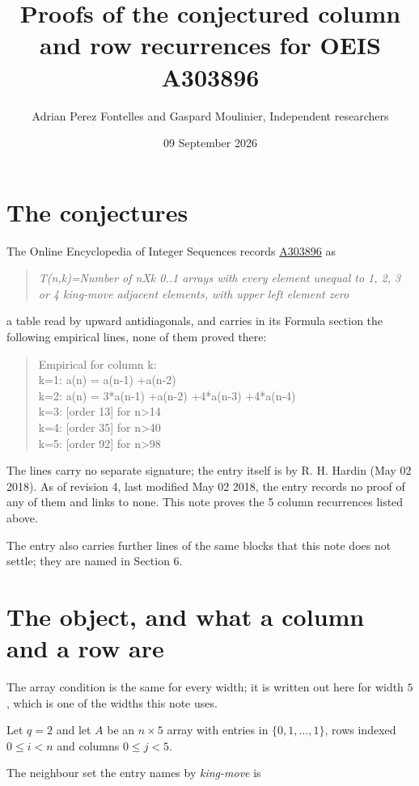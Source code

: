 \documentclass[11pt]{article}
\title{Proofs of the conjectured column and row recurrences for OEIS A303896}
\author{Adrian Perez Fontelles and Gaspard Moulinier, Independent researchers}
\date{09 September 2026}
\theoremstyle{definition}
\begin{document}
\maketitle
\section{The conjectures}

The Online Encyclopedia of Integer Sequences records \href{https://oeis.org/A303896}{A303896} as

\begin{quote}\itshape T(n,k)=Number of nXk 0..1 arrays with every element unequal to 1, 2, 3 or 4 king-move adjacent elements, with upper left element zero\end{quote}

a table read by upward antidiagonals, and carries in its Formula section the following empirical lines, none of them proved there:

\begin{quote}\ttfamily Empirical for column k:\\
k=1: a(n) = a(n-1) +a(n-2)\\k=2: a(n) = 3*a(n-1) +a(n-2) +4*a(n-3) +4*a(n-4)\\k=3: [order 13] for n>14\\k=4: [order 35] for n>40\\k=5: [order 92] for n>98\end{quote}

The lines carry no separate signature; the entry itself is by R. H. Hardin (May 02 2018). As of revision 4, last modified May 02 2018, the entry records no proof of any of them and links to none. This note proves the 5 column recurrences listed above.

The entry also carries further lines of the same blocks that this note does not settle; they are named in Section 6.

\section{The object, and what a column and a row are}

The array condition is the same for every width; it is written out here for width $5$, which is one of the widths this note uses.

Let $q = 2$ and let $A$ be an $n \times 5$ array with entries in $\{0,1,\dots,1\}$, rows indexed $0 \le i < n$ and columns $0 \le j < 5$.

The neighbour set the entry names by {\itshape king-move} is
\end{document}
